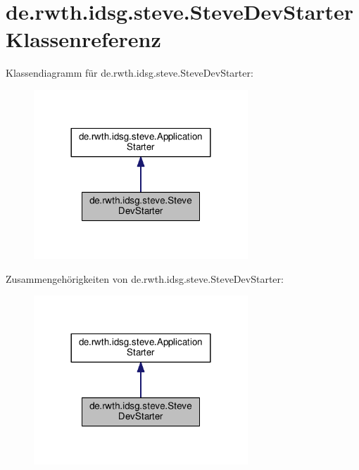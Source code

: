 \hypertarget{classde_1_1rwth_1_1idsg_1_1steve_1_1_steve_dev_starter}{\section{de.\-rwth.\-idsg.\-steve.\-Steve\-Dev\-Starter Klassenreferenz}
\label{classde_1_1rwth_1_1idsg_1_1steve_1_1_steve_dev_starter}
}


Klassendiagramm für de.\-rwth.\-idsg.\-steve.\-Steve\-Dev\-Starter\-:\nopagebreak
\begin{figure}[H]
\begin{center}
\leavevmode
\includegraphics[width=228pt]{classde_1_1rwth_1_1idsg_1_1steve_1_1_steve_dev_starter__inherit__graph}
\end{center}
\end{figure}


Zusammengehörigkeiten von de.\-rwth.\-idsg.\-steve.\-Steve\-Dev\-Starter\-:\nopagebreak
\begin{figure}[H]
\begin{center}
\leavevmode
\includegraphics[width=228pt]{classde_1_1rwth_1_1idsg_1_1steve_1_1_steve_dev_starter__coll__graph}
\end{center}
\end{figure}
